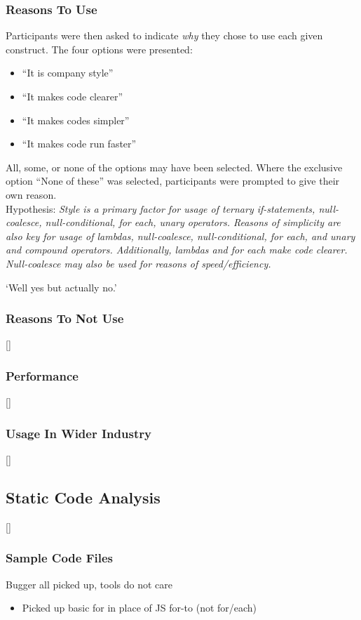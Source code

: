 \documentclass{article}
\begin{document}
        \subsubsection{Reasons To Use}
            Participants were then asked to indicate \emph{why} they chose to use each given construct. The four options were presented:
            \begin{itemize}
                \item ``It is company style''
                \item ``It makes code clearer''
                \item ``It makes codes simpler''
                \item ``It makes code run faster''
            \end{itemize}
            All, some, or none of the options may have been selected. Where the exclusive option ``None of these'' was selected, participants were prompted to give their own reason.
            \\\newline
            Hypothesis: \textit{Style is a primary factor for usage of ternary if-statements, null-coalesce, null-conditional, for each, unary operators. Reasons of simplicity are also key for usage of lambdas, null-coalesce, null-conditional, for each, and unary and compound operators. Additionally, lambdas and for each make code clearer. Null-coalesce may also be used for reasons of speed/efficiency.}
            \\\newline

            `Well yes but actually no.'
        \subsubsection{Reasons To Not Use}
            []
        \subsubsection{Performance}
            []
        \subsubsection{Usage In Wider Industry}
            []
    \subsection{Static Code Analysis}
        []
        \subsubsection{Sample Code Files}
            Bugger all picked up, tools do not care
            \begin{itemize}
                \item Picked up basic for in place of JS for-to (not for/each)
            \end{itemize}
\end{document}
